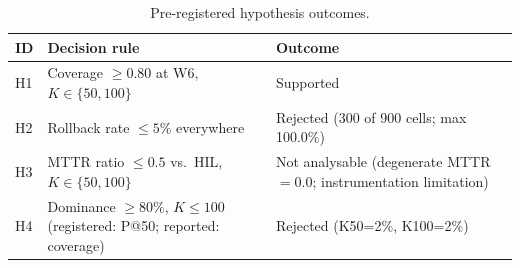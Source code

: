 \begin{table}[!t]
 \caption{Pre-registered hypothesis outcomes.}
 \label{tab:hypotheses}
 \centering
 \small
 \setlength{\tabcolsep}{4pt}
 \begin{tabular}{@{}p{0.5cm}p{4.0cm}p{3.0cm}@{}}
 \toprule
 \textbf{ID} & \textbf{Decision rule} & \textbf{Outcome} \\
 \midrule
 H1 & Coverage $\geq 0.80$ at W6, $K\in\{50,100\}$ & Supported \\
 H2 & Rollback rate $\leq 5\%$ everywhere & Rejected (300 of 900 cells; max 100.0\%) \\
 H3 & MTTR ratio $\leq 0.5$ vs.\ HIL, $K\in\{50,100\}$ & Not analysable (degenerate MTTR $=0.0$; instrumentation limitation) \\
 H4 & Dominance $\geq 80\%$, $K\leq 100$ (registered: P@50; reported: coverage) & Rejected (K50=2\%, K100=2\%) \\
 \bottomrule
 \end{tabular}
\end{table}
